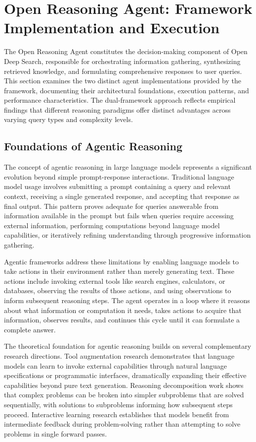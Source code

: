 \section{Open Reasoning Agent: Framework Implementation and Execution}

The Open Reasoning Agent constitutes the decision-making component of Open Deep Search, responsible for orchestrating information gathering, synthesizing retrieved knowledge, and formulating comprehensive responses to user queries. This section examines the two distinct agent implementations provided by the framework, documenting their architectural foundations, execution patterns, and performance characteristics. The dual-framework approach reflects empirical findings that different reasoning paradigms offer distinct advantages across varying query types and complexity levels.

\subsection{Foundations of Agentic Reasoning}

The concept of agentic reasoning in large language models represents a significant evolution beyond simple prompt-response interactions. Traditional language model usage involves submitting a prompt containing a query and relevant context, receiving a single generated response, and accepting that response as final output. This pattern proves adequate for queries answerable from information available in the prompt but fails when queries require accessing external information, performing computations beyond language model capabilities, or iteratively refining understanding through progressive information gathering.

Agentic frameworks address these limitations by enabling language models to take actions in their environment rather than merely generating text. These actions include invoking external tools like search engines, calculators, or databases, observing the results of those actions, and using observations to inform subsequent reasoning steps. The agent operates in a loop where it reasons about what information or computation it needs, takes actions to acquire that information, observes results, and continues this cycle until it can formulate a complete answer.

The theoretical foundation for agentic reasoning builds on several complementary research directions. Tool augmentation research demonstrates that language models can learn to invoke external capabilities through natural language specifications or programmatic interfaces, dramatically expanding their effective capabilities beyond pure text generation. Reasoning decomposition work shows that complex problems can be broken into simpler subproblems that are solved sequentially, with solutions to subproblems informing how subsequent steps proceed. Interactive learning research establishes that models benefit from intermediate feedback during problem-solving rather than attempting to solve problems in single forward passes.

